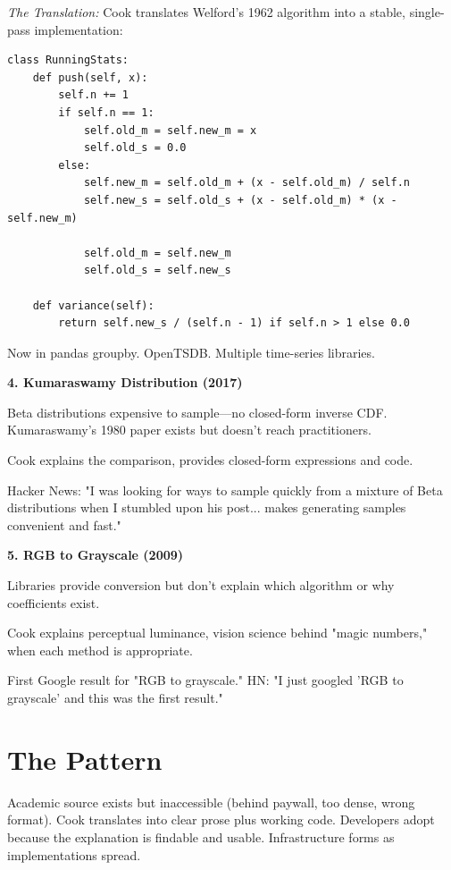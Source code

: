 \textit{The Translation:} Cook translates Welford's 1962 algorithm into a stable, single-pass implementation:

\begin{lstlisting}[style=python]
class RunningStats:
    def push(self, x):
        self.n += 1
        if self.n == 1:
            self.old_m = self.new_m = x
            self.old_s = 0.0
        else:
            self.new_m = self.old_m + (x - self.old_m) / self.n
            self.new_s = self.old_s + (x - self.old_m) * (x - self.new_m)

            self.old_m = self.new_m
            self.old_s = self.new_s

    def variance(self):
        return self.new_s / (self.n - 1) if self.n > 1 else 0.0
\end{lstlisting}

Now in pandas groupby. OpenTSDB. Multiple time-series libraries.

\textbf{4. Kumaraswamy Distribution (2017)}

Beta distributions expensive to sample---no closed-form inverse CDF. Kumaraswamy's 1980 paper exists but doesn't reach practitioners.

Cook explains the comparison, provides closed-form expressions and code.

Hacker News: "I was looking for ways to sample quickly from a mixture of Beta distributions when I stumbled upon his post... makes generating samples convenient and fast."

\textbf{5. RGB to Grayscale (2009)}

Libraries provide conversion but don't explain which algorithm or why coefficients exist.

Cook explains perceptual luminance, vision science behind "magic numbers," when each method is appropriate.

First Google result for "RGB to grayscale." HN: "I just googled 'RGB to grayscale' and this was the first result."

\bigskip

\section*{The Pattern}

Academic source exists but inaccessible (behind paywall, too dense, wrong format). Cook translates into clear prose plus working code. Developers adopt because the explanation is findable and usable. Infrastructure forms as implementations spread.

